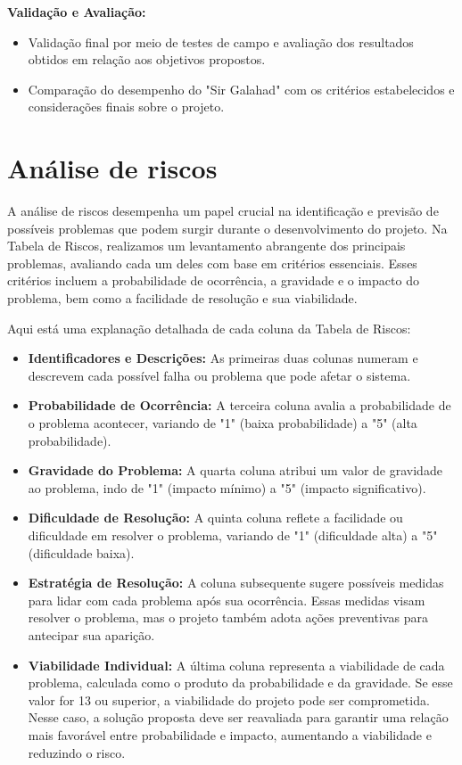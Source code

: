 \textbf{Validação e Avaliação:}
\begin{itemize}
   \item Validação final por meio de testes de campo e avaliação dos resultados obtidos em relação aos objetivos propostos.
   \item Comparação do desempenho do "Sir Galahad" com os critérios estabelecidos e considerações finais sobre o projeto.

\end{itemize}

\section{\textbf{Análise de riscos}}
A análise de riscos desempenha um papel crucial na identificação e previsão de possíveis problemas que podem surgir durante o desenvolvimento do projeto. Na Tabela de Riscos, realizamos um levantamento abrangente dos principais problemas, avaliando cada um deles com base em critérios essenciais. Esses critérios incluem a probabilidade de ocorrência, a gravidade e o impacto do problema, bem como a facilidade de resolução e sua viabilidade.

Aqui está uma explanação detalhada de cada coluna da Tabela de Riscos:

\begin{itemize}
   \item \textbf{Identificadores e Descrições:} As primeiras duas colunas numeram e descrevem cada possível falha ou problema que pode afetar o sistema.
   \item \textbf{Probabilidade de Ocorrência:} A terceira coluna avalia a probabilidade de o problema acontecer, variando de "1" (baixa probabilidade) a "5" (alta probabilidade).
   \item \textbf{Gravidade do Problema:} A quarta coluna atribui um valor de gravidade ao problema, indo de "1" (impacto mínimo) a "5" (impacto significativo).
   \item \textbf{Dificuldade de Resolução:} A quinta coluna reflete a facilidade ou dificuldade em resolver o problema, variando de "1" (dificuldade alta) a "5" (dificuldade baixa).
   \item \textbf{Estratégia de Resolução:} A coluna subsequente sugere possíveis medidas para lidar com cada problema após sua ocorrência. Essas medidas visam resolver o problema, mas o projeto também adota ações preventivas para antecipar sua aparição.
   \item \textbf{Viabilidade Individual:} A última coluna representa a viabilidade de cada problema, calculada como o produto da probabilidade e da gravidade. Se esse valor for 13 ou superior, a viabilidade do projeto pode ser comprometida. Nesse caso, a solução proposta deve ser reavaliada para garantir uma relação mais favorável entre probabilidade e impacto, aumentando a viabilidade e reduzindo o risco.
   
\end{itemize}

